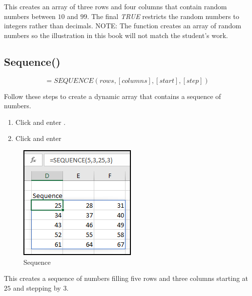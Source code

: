 This creates an array of three rows and four columns that contain random numbers between $ 10 $ and $ 99 $. The final \textit{TRUE} restricts the random numbers to integers rather than decimals. NOTE: The function creates an array of random numbers so the illustration in this book will not match the student's work.

\subsection{Sequence()}

\[ =SEQUENCE(rows,[columns],[start],[step]) \]

Follow these steps to create a dynamic array that contains a sequence of numbers.

\begin{enumbox}
	\begin{enumerate}
		\item Click  and enter .
		\item Click  and enter 
	\end{enumerate}
\end{enumbox}

\begin{figure}[H]
	\centering
	\includegraphics[width=\maxwidth{.45\linewidth}]{gfx/apb_fig09}
	\caption{Sequence}
	\label{apb:fig09}
\end{figure}

This creates a sequence of numbers filling five rows and three columns starting at $ 25 $ and stepping by $ 3 $. 

